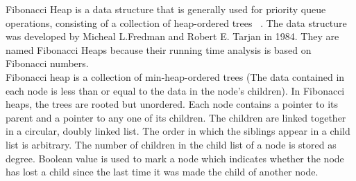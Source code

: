 Fibonacci Heap is a data structure that is generally used for priority queue operations, consisting of a collection of heap-ordered trees~\cite{wikiFiboHeap,cormen2009introduction} . The data structure was developed by Micheal L.Fredman and Robert E. Tarjan in 1984. They are named Fibonacci Heaps because their running time analysis is based on Fibonacci numbers. \\

Fibonacci heap is a collection of min-heap-ordered trees (The data contained in each node is less than or equal to the data  in the node's children). In Fibonacci heaps, the trees are rooted but unordered. Each node contains a pointer to its parent and a pointer to any one of its children. The children are linked together in a circular, doubly linked list. The order in which the siblings appear in a child list is arbitrary. The number of children in the child list of a node is stored as degree. Boolean value is used to mark a node which indicates whether  the node has lost a child since the last time it was made the child of another node.\\
